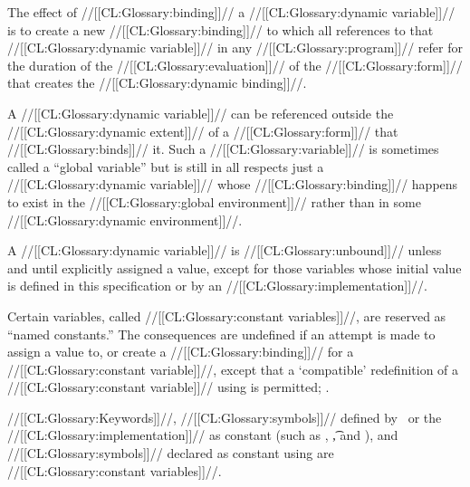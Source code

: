 The effect of //[[CL:Glossary:binding]]// a //[[CL:Glossary:dynamic variable]]// is to create
a new //[[CL:Glossary:binding]]// to which all references to that //[[CL:Glossary:dynamic variable]]//
in any //[[CL:Glossary:program]]// refer for the duration of the //[[CL:Glossary:evaluation]]// of the //[[CL:Glossary:form]]//
that creates the //[[CL:Glossary:dynamic binding]]//.









A //[[CL:Glossary:dynamic variable]]// can be referenced outside the //[[CL:Glossary:dynamic extent]]// of
a //[[CL:Glossary:form]]// that //[[CL:Glossary:binds]]// it.  Such a //[[CL:Glossary:variable]]// is sometimes called 
a ``global variable'' but is still in all respects just a //[[CL:Glossary:dynamic variable]]//
whose //[[CL:Glossary:binding]]// happens to exist in the //[[CL:Glossary:global environment]]// rather than in some
//[[CL:Glossary:dynamic environment]]//.


A //[[CL:Glossary:dynamic variable]]// is //[[CL:Glossary:unbound]]//
unless and until explicitly assigned a value, except for 
those variables whose initial value is 
defined in this specification or by an //[[CL:Glossary:implementation]]//.





\endsubsubsubsubsection%




Certain variables, called //[[CL:Glossary:constant variables]]//, are reserved as ``named constants.''  
The consequences are undefined if an attempt is made to 
    assign a value to,
 or create
a //[[CL:Glossary:binding]]// for a //[[CL:Glossary:constant variable]]//, 
except that a `compatible' redefinition of a //[[CL:Glossary:constant variable]]//
using  is permitted; .

//[[CL:Glossary:Keywords]]//, 
//[[CL:Glossary:symbols]]// defined by \clisp\ or the //[[CL:Glossary:implementation]]//
  as constant (such as \nil, \t, and ),
and //[[CL:Glossary:symbols]]// declared as constant using 
are //[[CL:Glossary:constant variables]]//.

\endsubsubsubsubsection%

